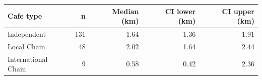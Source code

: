 \begingroup\footnotesize
\begin{tabular}{lrrrr}
  \toprule
Cafe type & n & Median (km) & CI lower (km) & CI upper (km) \\ 
  \midrule
Independent & 131 & 1.64 & 1.36 & 1.91 \\ 
  Local Chain &  48 & 2.02 & 1.64 & 2.44 \\ 
  International Chain &   9 & 0.58 & 0.42 & 2.36 \\ 
   \bottomrule
\end{tabular}
\endgroup
